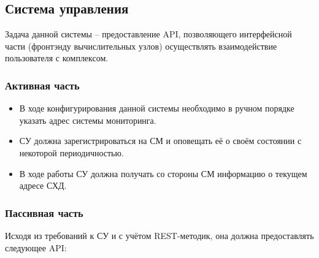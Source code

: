 \documentclass[a4paper,12pt]{report}
\numberwithin{equation}{section}
\begin{document}
  \subsection{Система управления}
  Задача данной системы -- предоставление API, позволяющего интерфейсной части (фронтэнду вычислительных узлов) осуществлять взаимодействие пользователя с комплексом.
  
  \subsubsection{Активная часть}
  \begin{itemize}
    \item В ходе конфигурирования данной системы необходимо в ручном порядке указать адрес системы мониторинга.
    \item СУ должна зарегистрироваться на СМ и оповещать её о своём состоянии с некоторой периодичностью.
    \item В ходе работы СУ должна получать со стороны СМ информацию о текущем адресе СХД.
  \end{itemize}
  
  \subsubsection{Пассивная часть}
  Исходя из требований к СУ и с учётом REST-методик, она должна предоставлять следующее API:
  
\end{document}
